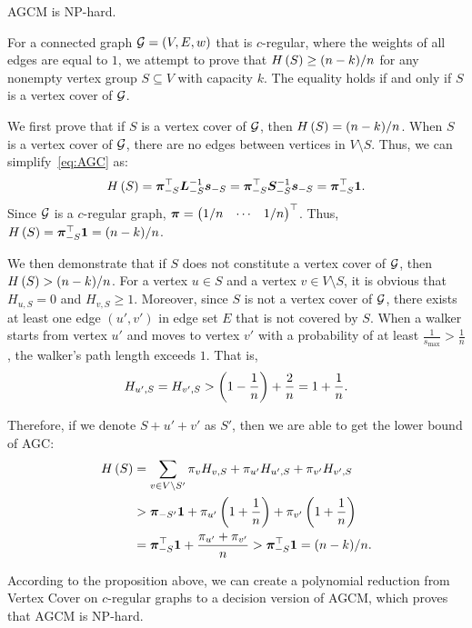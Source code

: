 \documentclass[journal]{IEEEtran}
\begin{document}
\begin{theorem}\label{thm:np-hard}
    AGCM is NP-hard.
\end{theorem}
\begin{IEEEproof}
    For a connected graph \(\mathcal{G}=(V,E,w)\) that is \(c\)-regular, where the weights of all edges are equal to \(1\), we attempt to prove that \(H\left(S\right)\ge (n-k)/n\) for any nonempty vertex group \(S\subseteq V\) with capacity \(k\).
    The equality holds if and only if \(S\) is a vertex cover of \(\mathcal{G}\).

    We first prove that if \(S\) is a vertex cover of \(\mathcal{G}\), then \(H\left(S\right)=(n-k)/n\). When \(S\) is a vertex cover of \(\mathcal{G}\), there are no edges between vertices in \(V\setminus S\).
    Thus, we can simplify~\eqref{eq:AGC} as:
    \begin{equation*}
        H\left(S\right)=\boldsymbol{\pi}_{-S}^\top\boldsymbol{L}_{-S}^{-1}\boldsymbol{s}_{-S}=\boldsymbol{\pi}_{-S}^\top\boldsymbol{S}_{-S}^{-1}\boldsymbol{s}_{-S}=\boldsymbol{\pi}_{-S}^\top\boldsymbol{1}.
    \end{equation*}
    Since \(\mathcal{G}\) is a \(c\)-regular graph, \(\boldsymbol{\pi}=\begin{pmatrix}1/n&\cdots&1/n\end{pmatrix}^\top\).
    Thus, \(H\left(S\right)=\boldsymbol{\pi}_{-S}^\top\boldsymbol{1}=(n-k)/n\).

    We then demonstrate that if \(S\) does not constitute a vertex cover of \(\mathcal{G}\), then \(H\left(S\right)>(n-k)/n\).
    For a vertex \(u\in S\) and a vertex \(v\in V\setminus S\), it is obvious that \(H_{u,S}=0\) and \(H_{v,S}\ge1\).
    Moreover, since \(S\) is not a vertex cover of \(\mathcal{G}\), there exists at least one edge \((u',v')\) in edge set \(E\) that is not covered by \(S\).
    When a walker starts from vertex \(u'\) and moves to vertex \(v'\) with a probability of at least \(\frac{1}{s_{\max}}>\frac{1}{n}\), the walker's path length exceeds \(1\).
    That is,
    \begin{equation*}
        H_{u',S}=H_{v',S}>\left( 1-\frac{1}{n} \right)+\frac{2}{n}=1+\frac{1}{n}.
    \end{equation*}

    Therefore, if we denote \(S+u'+v'\) as \(S'\), then we are able to get the lower bound of AGC:
    \begin{align*}
        H\left(S\right) & =\sum_{v\in V\setminus S'}\pi_vH_{v,S}+\pi_{u'}H_{u',S}+\pi_{v'}H_{v',S}         \\
                 & >\boldsymbol{\pi}_{-S'}\boldsymbol{1}+\pi_{u'}\left( 1+\frac{1}{n} \right)+\pi_{v'}\left( 1+\frac{1}{n} \right) \\
                 & =\boldsymbol{\pi}_{-S}^\top\boldsymbol{1}+\frac{\pi_{u'}+\pi_{v'}}n
        >\boldsymbol{\pi}_{-S}^\top\boldsymbol{1}=(n-k)/n.
    \end{align*}

    According to the proposition above, we can create a polynomial reduction from Vertex Cover on \(c\)-regular graphs to a decision version of AGCM, which proves that AGCM is NP-hard.

\end{IEEEproof}
\end{document}
